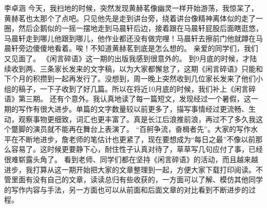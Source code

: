 {}\markdownRendererInterblockSeparator
{}李卓涵\markdownRendererInterblockSeparator
{}今天，我扫地的时候，突然发现黄赫茗像幽灵一样开始游荡，我惊呆了，黄赫茗也太那个了点吧。只见他先是走到讲台旁，绕着讲台像精神离体似的走了一圈，然后企鹅似的一摇一摆地走到马晨轩后边，接着跟在马晨轩屁股后面瞎逛悠，马晨轩走到哪儿他跟到哪儿，他作业都还没有做完哩！马晨轩去擦前门他就蹲在马晨轩旁边傻傻地看着。唉！不知道黄赫茗到底是怎么想的。\markdownRendererInterblockSeparator
{}\markdownRendererInterblockSeparator
{}亲爱的同学们，我们又见面了。\markdownRendererInterblockSeparator
{}《闲言碎语》这一期的出版我感到很意外的。\markdownRendererInterblockSeparator
{}到9月底的时候，才陆续收到两、三条家长发来的文字稿，以为大家都懈怠了，这期《闲言碎语》只能和下个月的积攒到一起再发行了。没想到，周一晚上突然收到几位家长发来了他们小组的稿子，一下子收到了好几篇。所以在将近10月底的时候，我们补上《闲言碎语》第三期。\markdownRendererInterblockSeparator
{}还有个意外。我认真地读了每一篇短文，发现经过一个暑假，这一期的写作有很大进步。单篇的文字数量较以前更多了，描写事情经过更流畅、生动，观察事物更细致，词汇也更丰富了。真是长江后浪推前浪，再过不了多久我这个蹩脚的演员就不能再在舞台上表演了。\markdownRendererInterblockSeparator
{}“百舸争流，奋楫者先”。大家的写作水平在不断地进步，詹老师的笔估计也更紧了，现在要想成为“每日之最”不像以前那么容易了。这时候更要静下心，耐住性子认真对待了，草草写几句应付了事，已经很难崭露头角了。\markdownRendererInterblockSeparator
{}看到老师、同学们都在坚持《闲言碎语》的活动，而且越来越进步，我打算从这一期开始把大家的文章整理到一起，方便大家下载打印阅读。不管里面有没有自己的文章，读读总归有些收获的，一方面可以了解、模仿其他同学的写作内容与手法，另一方面也可以从前面和后面文章的对比看到不断进步的过程。\markdownRendererDocumentEnd